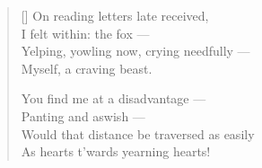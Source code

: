 \begin{verse}[\textwidth]
  On reading letters late received,\\
  I felt within: the fox ---\\
  Yelping, yowling now, crying needfully ---\\
  Myself, a craving beast.

  You find me at a disadvantage ---\\
  Panting and aswish ---\\
  Would that distance be traversed as easily\\
  As hearts t’wards yearning hearts!
\end{verse}
